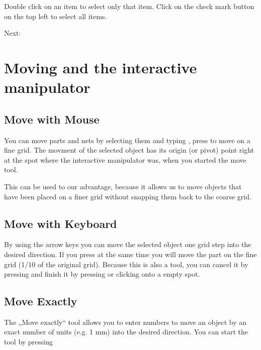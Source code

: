 \documentclass[letterpaper,10pt,czech]{sphinxmanual}
\begin{document}
Double click on an item to select only that item. Click on the check mark button on the top left to select all items.

Next: {\hyperref[\detokenize{move::doc}]{}}


\chapter{Moving and the interactive manipulator}
\label{\detokenize{move:moving-and-the-interactive-manipulator}}\label{\detokenize{move::doc}}

\section{Move with Mouse}
\label{\detokenize{move:move-with-mouse}}
You can move parts and nets by selecting them and typing , press  to move on a fine grid. The movment of the selected object has its origin (or pivot) point right at the spot where the interactive manipulator was, when you started the move tool.

This can be used to our advantage, because it allows us to move objects that have been placed on a finer grid without snapping them back to the coarse grid.


\section{Move with Keyboard}
\label{\detokenize{move:move-with-keyboard}}
By using the  arrow keys you can move the selected object one grid step into the desired direction. If you press  at the same time you will move the part on the fine grid (1/10 of the original grid). Because this is also a tool, you can cancel it by pressing  and finish it by pressing  or clicking onto a empty spot.


\section{Move Exactly}
\label{\detokenize{move:move-exactly}}
The „Move exactly“ tool allows you to enter numbers to move an object by an exact number of units (e.g. 1 mm) into the desired direction. You can start the tool by pressing 
\end{document}
